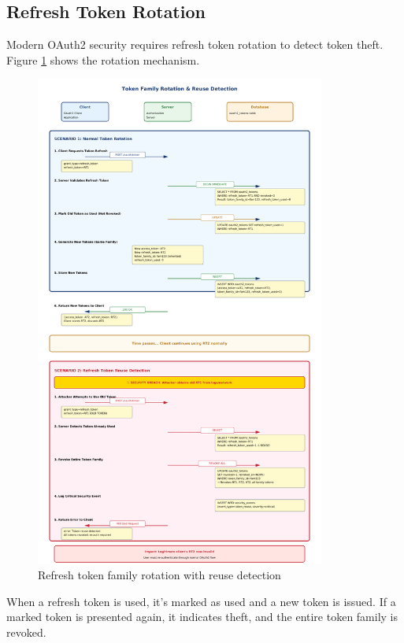 \documentclass[12pt,a4paper]{article}
\begin{document}
\subsection{Refresh Token Rotation}

Modern OAuth2 security requires refresh token rotation to detect token theft. Figure \ref{fig:token_rotation} shows the rotation mechanism.

\begin{figure}[H]
    \centering
    \includegraphics[width=0.85\textwidth]{diagrams/14_token_family_rotation.pdf}
    \caption{Refresh token family rotation with reuse detection}
    \label{fig:token_rotation}
\end{figure}

When a refresh token is used, it's marked as used and a new token is issued. If a marked token is presented again, it indicates theft, and the entire token family is revoked.
\end{document}
